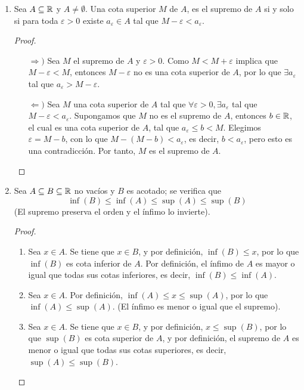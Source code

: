 \begin{enumerate}[label=\roman*)]
 \item Sea $A\subseteq \mathbb{R}$ y $A\neq \emptyset$. Una cota superior $M$ de $A$, es el supremo de $A$ si y solo si para toda $\varepsilon>0$ existe $a_\varepsilon \in A$ tal que $M-\varepsilon<a_\varepsilon$.

  \begin{proof}\leavevmode
  \begin{itemize}
  \item[$\Rightarrow)$] Sea $M$ el supremo de $A$ y $\varepsilon>0$. Como $M<M+\varepsilon$ implica que $M-\varepsilon<M$, entonces $M-\varepsilon$ no es una cota superior de $A$, por lo que $\exists a_\varepsilon$ tal que $a_\varepsilon>M-\varepsilon$.
  \item[$\Leftarrow)$] Sea $M$ una cota superior de $A$ tal que $\forall \varepsilon>0, \exists a_{\varepsilon}$ tal que $M-\varepsilon<a_{\varepsilon}$. Supongamos que $M$ no es el supremo de $A$, entonces $b\in \mathbb{R}$, el cual es una cota superior de $A$, tal que $a_\varepsilon \leq b < M$. Elegimos $\varepsilon = M-b$, con lo que $M-(M-b)<a_\varepsilon$, es decir, $b<a_{\varepsilon}$, pero esto es una contradicción. Por tanto, $M$ es el supremo de $A$. \qedhere
  \end{itemize}
  \end{proof}
  
\item Sea $A\subseteq B\subseteq \mathbb{R}$ no vacíos y $B$ es acotado; se verifica que \[\inf (B) \leq \inf (A) \leq \sup (A) \leq \sup (B)\] (El supremo preserva el orden y el ínfimo lo invierte).

  \begin{proof}\leavevmode
    \begin{enumerate}[label=\roman*)]
      \item Sea $x\in A$. Se tiene que $x\in B$, y por definición, $\inf (B) \leq x$, por lo que $\inf (B)$ es cota inferior de $A$. Por definición, el ínfimo de $A$ es mayor o igual que todas sus cotas inferiores, es decir, $\inf (B) \leq \inf (A)$.
      \item Sea $x\in A$. Por definición, $\inf (A) \leq x \leq \sup (A)$, por lo que $\inf (A) \leq \sup (A)$. (El ínfimo es menor o igual que el supremo).
      \item Sea $x\in A$. Se tiene que $x\in B$, y por definición, $x\leq \sup (B)$, por lo que $\sup (B)$ es cota superior de $A$, y por definición, el supremo de $A$ es menor o igual que todas sus cotas superiores, es decir, $\sup (A) \leq \sup (B)$. \qedhere
    \end{enumerate}
  \end{proof}
  

\end{enumerate}
